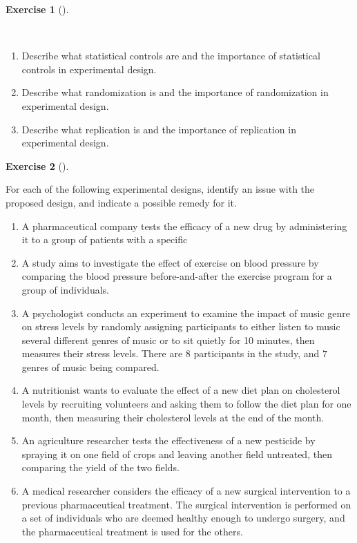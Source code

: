 \documentclass[
  letterpaper,
  DIV=11,
  numbers=noendperiod]{scrreprt}
\providecommand{\tightlist}{%
  \setlength{\itemsep}{0pt}\setlength{\parskip}{0pt}}\usepackage{longtable,booktabs,array}
\theoremstyle{definition}
\newtheorem{exercise}{Exercise}[chapter]
\theoremstyle{definition}
\theoremstyle{definition}
\theoremstyle{remark}
\begin{document}
\begin{exercise}[]\protect\hypertarget{exr-10.18}{}\label{exr-10.18}

~

\begin{enumerate}
\def\labelenumi{\alph{enumi}.}
\tightlist
\item
  Describe what statistical controls are and the importance of
  statistical controls in experimental design.
\item
  Describe what randomization is and the importance of randomization in
  experimental design.
\item
  Describe what replication is and the importance of replication in
  experimental design.
\end{enumerate}

\end{exercise}

\begin{exercise}[]\protect\hypertarget{exr-10.19}{}\label{exr-10.19}

For each of the following experimental designs, identify an issue with
the proposed design, and indicate a possible remedy for it.

\begin{enumerate}
\def\labelenumi{\alph{enumi}.}
\tightlist
\item
  A pharmaceutical company tests the efficacy of a new drug by
  administering it to a group of patients with a specific
\item
  A study aims to investigate the effect of exercise on blood pressure
  by comparing the blood pressure before-and-after the exercise program
  for a group of individuals.
\item
  A psychologist conducts an experiment to examine the impact of music
  genre on stress levels by randomly assigning participants to either
  listen to music several different genres of music or to sit quietly
  for 10 minutes, then measures their stress levels. There are \(8\)
  participants in the study, and \(7\) genres of music being compared.
\item
  A nutritionist wants to evaluate the effect of a new diet plan on
  cholesterol levels by recruiting volunteers and asking them to follow
  the diet plan for one month, then measuring their cholesterol levels
  at the end of the month.
\item
  An agriculture researcher tests the effectiveness of a new pesticide
  by spraying it on one field of crops and leaving another field
  untreated, then comparing the yield of the two fields.
\item
  A medical researcher considers the efficacy of a new surgical
  intervention to a previous pharmaceutical treatment. The surgical
  intervention is performed on a set of individuals who are deemed
  healthy enough to undergo surgery, and the pharmaceutical treatment is
  used for the others.
\end{enumerate}

\end{exercise}
\end{document}
